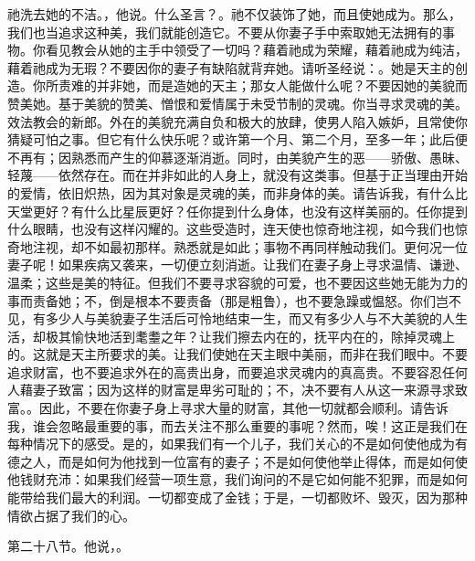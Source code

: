 祂洗去她的不洁。，他说。什么圣言？。祂不仅装饰了她，而且使她成为。那么，我们也当追求这种美，我们就能创造它。不要从你妻子手中索取她无法拥有的事物。你看见教会从她的主手中领受了一切吗？藉着祂成为荣耀，藉着祂成为纯洁，藉着祂成为无瑕？不要因你的妻子有缺陷就背弃她。请听圣经说：。她是天主的创造。你所责难的并非她，而是造她的天主；那女人能做什么呢？不要因她的美貌而赞美她。基于美貌的赞美、憎恨和爱情属于未受节制的灵魂。你当寻求灵魂的美。效法教会的新郎。外在的美貌充满自负和极大的放肆，使男人陷入嫉妒，且常使你猜疑可怕之事。但它有什么快乐呢？或许第一个月、第二个月，至多一年；此后便不再有；因熟悉而产生的仰慕逐渐消逝。同时，由美貌产生的恶——骄傲、愚昧、轻蔑——依然存在。而在并非如此的人身上，就没有这类事。但基于正当理由开始的爱情，依旧炽热，因为其对象是灵魂的美，而非身体的美。请告诉我，有什么比天堂更好？有什么比星辰更好？任你提到什么身体，也没有这样美丽的。任你提到什么眼睛，也没有这样闪耀的。这些受造时，连天使也惊奇地注视，如今我们也惊奇地注视，却不如最初那样。熟悉就是如此；事物不再同样触动我们。更何况一位妻子呢！如果疾病又袭来，一切便立刻消逝。让我们在妻子身上寻求温情、谦逊、温柔；这些是美的特征。但我们不要寻求容貌的可爱，也不要因这些她无能为力的事而责备她；不，倒是根本不要责备（那是粗鲁），也不要急躁或愠怒。你们岂不见，有多少人与美貌妻子生活后可怜地结束一生，而又有多少人与不大美貌的人生活，却极其愉快地活到耄耋之年？让我们擦去内在的，抚平内在的，除掉灵魂上的。这就是天主所要求的美。让我们使她在天主眼中美丽，而非在我们眼中。不要追求财富，也不要追求外在的高贵出身，而要追求灵魂内的真高贵。不要容忍任何人藉妻子致富；因为这样的财富是卑劣可耻的；不，决不要有人从这一来源寻求致富。。因此，不要在你妻子身上寻求大量的财富，其他一切就都会顺利。请告诉我，谁会忽略最重要的事，而去关注不那么重要的事呢？然而，唉！这正是我们在每种情况下的感受。是的，如果我们有一个儿子，我们关心的不是如何使他成为有德之人，而是如何为他找到一位富有的妻子；不是如何使他举止得体，而是如何使他钱财充沛：如果我们经营一项生意，我们询问的不是它如何能不犯罪，而是如何能带给我们最大的利润。一切都变成了金钱；于是，一切都败坏、毁灭，因为那种情欲占据了我们的心。\par

第二十八节。他说，。\par

